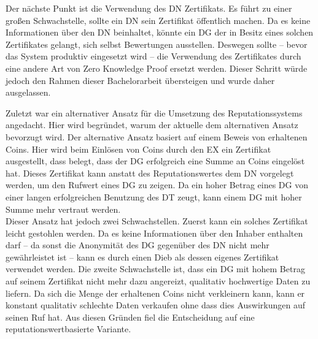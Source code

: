 \documentclass[
	fontsize=11pt,
	headings=small,
	parskip=half,           %
	bibliography=totoc,
	numbers=noenddot,       %
	open=any,               %
]{scrreprt}
\begin{document}
Der nächste Punkt ist die Verwendung des DN Zertifikats. Es führt zu einer großen Schwachstelle, sollte ein DN sein Zertifikat öffentlich machen. Da es keine Informationen über den DN beinhaltet, könnte ein DG der in Besitz eines solchen Zertifikates gelangt, sich selbst Bewertungen ausstellen. Deswegen sollte -- bevor das System produktiv eingesetzt wird -- die Verwendung des Zertifikates durch eine andere Art von Zero Knowledge Proof ersetzt werden. Dieser Schritt würde jedoch den Rahmen dieser Bachelorarbeit übersteigen und wurde daher ausgelassen.

Zuletzt war ein alternativer Ansatz für die Umsetzung des Reputationssystems angedacht. Hier wird begründet, warum der aktuelle dem alternativen Ansatz bevorzugt wird. Der alternative Ansatz basiert auf einem Beweis von erhaltenen Coins. Hier wird beim Einlösen von Coins durch den EX ein Zertifikat ausgestellt, dass belegt, dass der DG erfolgreich eine Summe an Coins eingelöst hat. Dieses Zertifikat kann anstatt des Reputationswertes dem DN vorgelegt werden, um den Rufwert eines DG zu zeigen. Da ein hoher Betrag eines DG von einer langen erfolgreichen Benutzung des DT zeugt, kann einem DG mit hoher Summe mehr vertraut werden. \\
Dieser Ansatz hat jedoch zwei Schwachstellen. Zuerst kann ein solches Zertifikat leicht gestohlen werden. Da es keine Informationen über den Inhaber enthalten darf -- da sonst die Anonymität des DG gegenüber des DN nicht mehr gewährleistet ist -- kann es durch einen Dieb als dessen eigenes Zertifikat verwendet werden. Die zweite Schwachstelle ist, dass ein DG mit hohem Betrag auf seinem Zertifikat nicht mehr dazu angereizt, qualitativ hochwertige Daten zu liefern. Da sich die Menge der erhaltenen Coins nicht verkleinern kann, kann er konstant qualitativ schlechte Daten verkaufen ohne dass dies Auswirkungen auf seinen Ruf hat. Aus diesen Gründen fiel die Entscheidung  auf eine reputationswertbasierte Variante.

\end{document}
